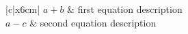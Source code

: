 \documentclass{article}
\begin{document}
  \begin{table}[ht!]
    \centering
    \begin{tabular}{|c|x{6cm}|}
      \(a + b\)  & first equation description    \\ %
      \(a - c\)  & second equation description   \\
    \end{tabular}
  \end{table}
\end{document}
